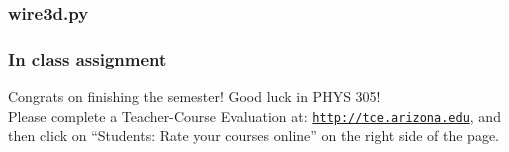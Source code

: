 \documentclass{beamer}
\begin{document}
\begin{frame}
  \frametitle{wire3d.py}
  
\end{frame}

\begin{frame}
  \frametitle{In class assignment}
  Congrats on finishing the semester! Good luck in PHYS 305!\\
  Please complete a Teacher-Course Evaluation at:
  \href{http://tce.arizona.edu}{\nolinkurl{http://tce.arizona.edu}},
  and then click on ``Students: Rate your courses online'' on the right side
  of the page.
\end{frame}
\end{document}

